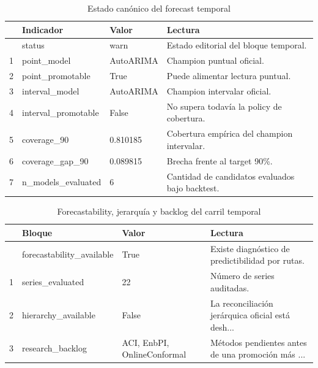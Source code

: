 \documentclass[
  spanish,
  11pt,
  letterpaper,
]{scrbook}
\theoremstyle{plain}
\theoremstyle{remark}
\begin{document}
{

\begin{longtable}[]{@{}llll@{}}

\caption{\label{tbl-ts-governed-status}Estado canónico del forecast
temporal}

\tabularnewline

\toprule\noalign{}
& Indicador & Valor & Lectura \\
\midrule\noalign{}
\endhead
\bottomrule\noalign{}
\endlastfoot
0 & status & warn & Estado editorial del bloque temporal. \\
1 & point\_model & AutoARIMA & Champion puntual oficial. \\
2 & point\_promotable & True & Puede alimentar lectura puntual. \\
3 & interval\_model & AutoARIMA & Champion intervalar oficial. \\
4 & interval\_promotable & False & No supera todavía la policy de
cobertura. \\
5 & coverage\_90 & 0.810185 & Cobertura empírica del champion
intervalar. \\
6 & coverage\_gap\_90 & 0.089815 & Brecha frente al target 90\%. \\
7 & n\_models\_evaluated & 6 & Cantidad de candidatos evaluados bajo
backtest. \\

\end{longtable}

}

{

\begin{longtable}[]{@{}llll@{}}

\caption{\label{tbl-ts-forecastability-hierarchy}Forecastability,
jerarquía y backlog del carril temporal}

\tabularnewline

\toprule\noalign{}
& Bloque & Valor & Lectura \\
\midrule\noalign{}
\endhead
\bottomrule\noalign{}
\endlastfoot
0 & forecastability\_available & True & Existe diagnóstico de
predictibilidad por rutas. \\
1 & series\_evaluated & 22 & Número de series auditadas. \\
2 & hierarchy\_available & False & La reconciliación jerárquica oficial
está desh... \\
3 & research\_backlog & ACI, EnbPI, OnlineConformal & Métodos pendientes
antes de una promoción más ... \\

\end{longtable}

}
\end{document}
